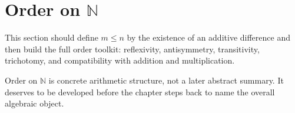 \section{Order on \texorpdfstring{$\mathbb{N}$}{N}}

This section should define \(m \le n\) by the existence of an additive
difference and then build the full order toolkit: reflexivity, antisymmetry,
transitivity, trichotomy, and compatibility with addition and multiplication.

\begin{remark}
Order on $\mathbb{N}$ is concrete arithmetic structure, not a later abstract
summary. It deserves to be developed before the chapter steps back to name
the overall algebraic object.
\end{remark}
